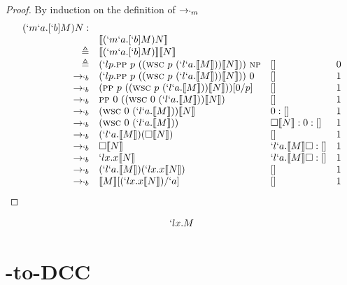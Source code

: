 \begin{proof}{By induction on the definition of $\rightarrow_{`m}$}
\[
\begin{array}{rllrr}
  (`m`a.[`b]M) N: \\
  & \dbr{(`m`a.[`b]M) N} \\
  \triangleq & \dbr{(`m`a.[`b]M)} \dbr{N} \\
  \triangleq & (`lp.\pp\ p\ ((\wsc\ p\ (`l`a.\dbr{M})) \dbr{N}))\ \np & [] & 0 \\
  \rightarrow_{`b} & (`lp.\pp\ p\ ((\wsc\ p\ (`l`a.\dbr{M})) \dbr{N}))\ 0 & [] & 1 \\
  \rightarrow_{`b} & (\pp\ p\ ((\wsc\ p\ (`l`a.\dbr{M})) \dbr{N}))[0/p] & [] & 1 \\
  \rightarrow_{`b} & \pp\ 0\ ((\wsc\ 0\ (`l`a.\dbr{M})) \dbr{N}) & [] & 1\\
  \rightarrow_{`b} & (\wsc\ 0\ (`l`a.\dbr{M})) \dbr{N} & 0:[] & 1\\
  \rightarrow_{`b} & (\wsc\ 0\ (`l`a.\dbr{M})) & \square \dbr{N}:0:[] & 1\\
  \rightarrow_{`b} & (`l`a.\dbr{M})(\square \dbr{N}) & [] & 1\\
  \rightarrow_{`b} & \square \dbr{N} & `l`a.\dbr{M}\square:[] & 1\\
  \rightarrow_{`b} & `lx.x\dbr{N} & `l`a.\dbr{M}\square:[] & 1\\
  \rightarrow_{`b} & (`l`a.\dbr{M})(`lx.x\dbr{N}) & [] & 1\\
  \rightarrow_{`b} & \dbr{M}[(`lx.x\dbr{N})/`a] & [] & 1\\

\end{array}
\]
\end{proof}

\begin{figure}[!h]
\[
\begin{array}{lll}
  `lx.M
\end{array}
\]
\end{figure}

\section{\ltry-to-DCC}
